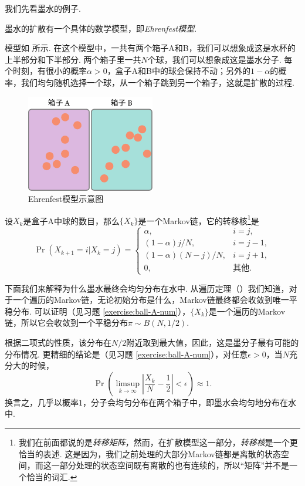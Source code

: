 我们先看墨水的例子. 
\begin{example}[墨水的扩散]\label{ex:ink-diffusion}
墨水的扩散有一个具体的数学模型，即\textit{Ehrenfest模型}. 

模型如 所示. 在这个模型中，一共有两个箱子A和B，我们可以想象成这是水杯的上半部分和下半部分. 两个箱子里一共$N$个球，我们可以想象成这是墨水分子. 每个时刻，有很小的概率$\alpha>0$，盒子A和B中的球会保持不动；另外的$1-\alpha$的概率，我们均匀随机选择一个球，从一个箱子跳到另一个箱子，这就是扩散的过程. 

\begin{figure}[ht]
    \centering
    \includegraphics[width=0.5\textwidth]{figures/Markov-chain/Ehrenfest-model.pdf}
    \caption{Ehrenfest模型示意图}\label{fig:ehrenfest-model}
\end{figure}

设$X_k$是盒子A中球的数目，那么$\{X_k\}$是一个Markov链，它的转移核\footnote{我们在前面都说的是\textit{转移矩阵}，然而，在扩散模型这一部分，\textit{转移核}是一个更恰当的表述. 这是因为，我们之前处理的大部分Markov链都是离散的状态空间，而这一部分处理的状态空间既有离散的也有连续的，所以“矩阵”并不是一个恰当的词汇. }是
\[
    \Pr(X_{k+1}=i|X_k=j) = \begin{cases}
        \alpha, & i = j,\\
        (1-\alpha)j/N, & i = j-1,\\
        (1-\alpha)(N-j)/N, & i = j+1,\\
        0, & \text{其他}.
    \end{cases}
\]

下面我们来解释为什么墨水最终会均匀分布在水中. 从遍历定理（）我们知道，对于一个遍历的Markov链，无论初始分布是什么，Markov链最终都会收敛到唯一平稳分布. 可以证明（见习题 \ref{exercise:ball-A-num}），$\{X_k\}$是一个遍历的Markov链，所以它会收敛到一个平稳分布$\pi\sim B(N,1/2)$. 

根据二项式的性质，该分布在$N/2$附近取到最大值，因此，这是墨分子最有可能的分布情况. 更精细的结论是（见习题 \ref{exercise:ball-A-num}），对任意$\epsilon>0$，当$N$充分大的时候，
\[
    \Pr\left(\limsup_{k\to\infty}\left|\frac{X_k}{N}-\frac{1}{2}\right|<\epsilon\right) \approx 1.
\]
换言之，几乎以概率$1$，分子会均匀分布在两个箱子中，即墨水会均匀地分布在水中.
\end{example}

